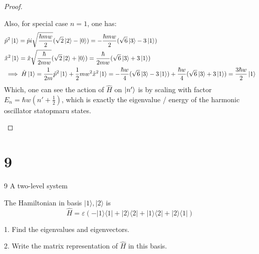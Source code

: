 \documentclass{article}
\begin{document}
\begin{proof}
\begin{enumerate}
        Also, for special case $n=1$, one has:
        \begin{align}
            &\hat{p}^2\ket{1} = \hat{p}i\sqrt{\frac{\hbar mw}{2}}(\sqrt{2}\ket{2}-\ket{0})= -\frac{\hbar mw}{2}(\sqrt{6}\ket{3} - 3\ket{1})\\
            &\hat{x}^2\ket{1} = \hat{x}\sqrt{\frac{\hbar}{2mw}}(\sqrt{2}\ket{2}+\ket{0}) = \frac{\hbar}{2mw}(\sqrt{6}\ket{3}+3\ket{1})\\
            &\implies \hat{H}\ket{1} = \frac{1}{2m}\hat{p}^2\ket{1}+\frac{1}{2}mw^2\hat{x}^2\ket{1} = -\frac{\hbar w}{4}(\sqrt{6}\ket{3}-3\ket{1}) + \frac{\hbar w}{4}(\sqrt{6}\ket{3}+3\ket{1}) = \frac{3\hbar w}{2}\ket{1}
        \end{align}
        Which, one can see the action of $\hat{H}$ on $\ket{n'}$ is by scaling with factor $E_n = \hbar w\left(n'+\frac{1}{2}\right)$, which is exactly the eigenvalue / energy of the harmonic oscillator statopmaru states.
    \end{enumerate}
\end{proof}

\newpage

\section*{9}
\begin{ques}\label{q9}
9 A two-level system

The Hamiltonian in basis $|1\rangle,|2\rangle$ is
\[
\hat{H} = \varepsilon(-|1\rangle\langle1| + |2\rangle\langle2| + |1\rangle\langle2| + |2\rangle\langle1|)
\]

1. Find the eigenvalues and eigenvectors.

2. Write the matrix representation of $\hat{H}$ in this basis.
\end{ques}
\end{document}
